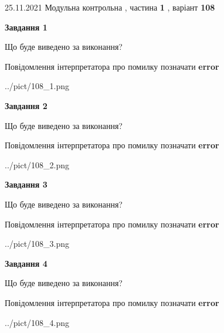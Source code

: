\documentclass[10pt, ukrainian]{article}
\begin{document}
{25.11.2021 Модульна контрольна , частина \textbf { 1 }, варіант  \No \textbf { 108 }\par}
{
\begin {large}

{\begin {center}\textbf{Завдання 1}\end {center}}\par
Що буде виведено за виконання? \par
Повідомлення інтерпретатора про помилку позначати \textbf{error}

\begin{center}
	{../pict/108_1.png}
\end{center}
\newpage

{\begin {center}\textbf{Завдання 2}\end {center}}\par
Що буде виведено за виконання? \par
Повідомлення інтерпретатора про помилку позначати \textbf{error}

\begin{center}
	{../pict/108_2.png}
\end{center}
\newpage

{\begin {center}\textbf{Завдання 3}\end {center}}\par
Що буде виведено за виконання? \par
Повідомлення інтерпретатора про помилку позначати \textbf{error}

\begin{center}
	{../pict/108_3.png}
\end{center}
\newpage

{\begin {center}\textbf{Завдання 4}\end {center}}\par
Що буде виведено за виконання? \par
Повідомлення інтерпретатора про помилку позначати \textbf{error}

\begin{center}
	{../pict/108_4.png}
\end{center}
\newpage


\end{large}}
\end{document}
